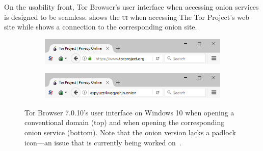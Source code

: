 On the usability front, Tor Browser's user interface when accessing onion
services is designed to be seamless.   shows the
\textsc{ui} when accessing The Tor Project's web site while
 shows a connection to the corresponding onion site.

\begin{figure}[t]
    \centering

    \begin{subfigure}[t]{\linewidth}
        \centering
        \includegraphics[width=\linewidth]{figures/non-onion-service.png}
        \label{fig:non-onion-service}
    \end{subfigure}

    \begin{subfigure}[t]{\linewidth}
        \centering
        \includegraphics[width=\linewidth]{figures/onion-service.png}
        \label{fig:onion-service}
    \end{subfigure}

    \caption{Tor Browser 7.0.10's user interface on Windows 10 when opening a
    conventional domain (top) and when opening the corresponding onion service
    (bottom).  Note that the onion version lacks a padlock icon---an issue
    that is currently being worked on~\cite{trac23247}.}
\end{figure}
